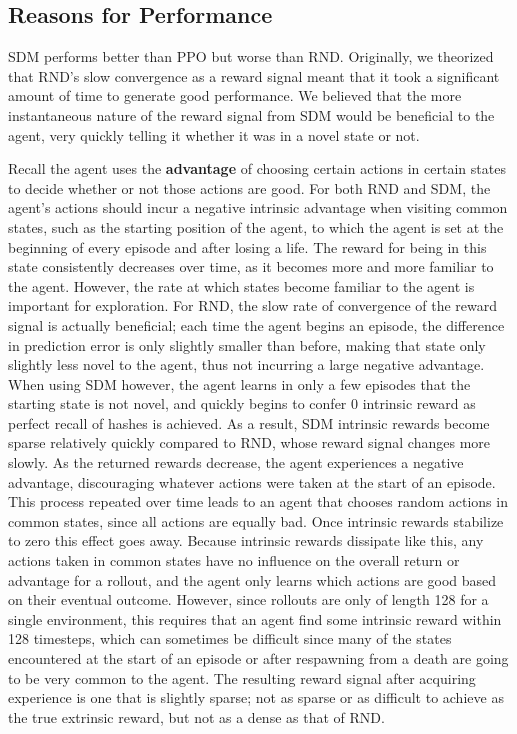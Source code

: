 \documentclass[journal, onecolumn, 12pt, draftclsnofoot]{IEEEtran}
\newcommand{\kword}[1]{\textbf{#1}}
\begin{document}
	\subsection{Reasons for Performance}
	\par SDM performs better than PPO but worse than RND. Originally, we theorized that RND's slow convergence as a reward signal meant that it took a significant amount of time to generate good performance. We believed that the more instantaneous nature of the reward signal from SDM would be beneficial to the agent, very quickly telling it whether it was in a novel state or not.
	\par Recall the agent uses the \kword{advantage} of choosing certain actions in certain states to decide whether or not those actions are good. For both RND and SDM, the agent's actions should incur a negative intrinsic advantage when visiting common states, such as the starting position of the agent, to which the agent is set at the beginning of every episode and after losing a life. The reward for being in this state consistently decreases over time, as it becomes more and more familiar to the agent. However, the rate at which states become familiar to the agent is important for exploration. For RND, the slow rate of convergence of the reward signal is actually beneficial; each time the agent begins an episode, the difference in prediction error is only slightly smaller than before, making that state only slightly less novel to the agent, thus not incurring a large negative advantage. When using SDM however, the agent learns in only a few episodes that the starting state is not novel, and quickly begins to confer 0 intrinsic reward as perfect recall of hashes is achieved. As a result, SDM intrinsic rewards become sparse relatively quickly compared to RND, whose reward signal changes more slowly. As the returned rewards decrease, the agent experiences a negative advantage, discouraging whatever actions were taken at the start of an episode. This process repeated over time leads to an agent that chooses random actions in common states, since all actions are equally bad. Once intrinsic rewards stabilize to zero this effect goes away. Because intrinsic rewards dissipate like this, any actions taken in common states have no influence on the overall return or advantage for a rollout, and the agent only learns which actions are good based on their eventual outcome. However, since rollouts are only of length 128 for a single environment, this requires that an agent find some intrinsic reward within 128 timesteps, which can sometimes be difficult since many of the states encountered at the start of an episode or after respawning from a death are going to be very common to the agent. The resulting reward signal after acquiring experience is one that is slightly sparse; not as sparse or as difficult to achieve as the true extrinsic reward, but not as a dense as that of RND.
\end{document}
